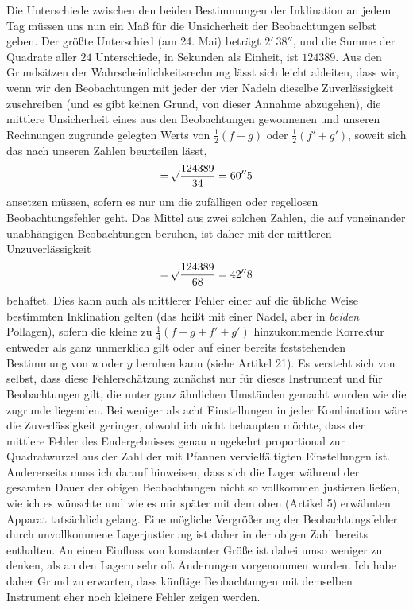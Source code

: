 Die Unterschiede zwischen den beiden Bestimmungen der Inklination an jedem Tag müssen uns nun ein Maß für die Unsicherheit der Beobachtungen selbst geben. Der größte Unterschied (am 24. Mai) beträgt $2'\ 38''$, und die Summe der Quadrate aller $24$ Unterschiede, in Sekunden als Einheit, ist $124389$. Aus den Grundsätzen der Wahrscheinlichkeitsrechnung lässt sich leicht ableiten, dass wir, wenn wir den Beobachtungen mit jeder der vier Nadeln dieselbe Zuverlässigkeit zuschreiben (und es gibt keinen Grund, von dieser Annahme abzugehen), die mittlere Unsicherheit eines aus den Beobachtungen gewonnenen und unseren Rechnungen zugrunde gelegten Werts von $\tfrac12(f+g)$ oder $\tfrac12(f'+g')$, soweit sich das nach unseren Zahlen beurteilen lässt,
\[
=\mathord{{}^{}\!\surd}\frac{124389}{34}=60''5
\]
ansetzen müssen, sofern es nur um die zufälligen oder regellosen Beobachtungsfehler geht. Das Mittel aus zwei solchen Zahlen, die auf voneinander unabhängigen Beobachtungen beruhen, ist daher mit der mittleren Unzuverlässigkeit
\[
=\mathord{{}^{}\!\surd}\frac{124389}{68}=42''8
\]
behaftet. Dies kann auch als mittlerer Fehler einer auf die übliche Weise bestimmten Inklination gelten (das heißt mit einer Nadel, aber in \textit{beiden} Pollagen), sofern die kleine zu $\tfrac14(f+g+f'+g')$ hinzukommende Korrektur entweder als ganz unmerklich gilt oder auf einer bereits feststehenden Bestimmung von $u$ oder $y$ beruhen kann (siehe Artikel 21). Es versteht sich von selbst, dass diese Fehlerschätzung zunächst nur für dieses Instrument und für Beobachtungen gilt, die unter ganz ähnlichen Umständen gemacht wurden wie die zugrunde liegenden. Bei weniger als acht Einstellungen in jeder Kombination wäre die Zuverlässigkeit geringer, obwohl ich nicht behaupten möchte, dass der mittlere Fehler des Endergebnisses genau umgekehrt proportional zur Quadratwurzel aus der Zahl der mit Pfannen vervielfältigten Einstellungen ist. Andererseits muss ich darauf hinweisen, dass sich die Lager während der gesamten Dauer der obigen Beobachtungen nicht so vollkommen justieren ließen, wie ich es wünschte und wie es mir später mit dem oben (Artikel 5) erwähnten Apparat tatsächlich gelang. Eine mögliche Vergrößerung der Beobachtungsfehler durch unvollkommene Lagerjustierung ist daher in der obigen Zahl bereits enthalten. An einen Einfluss von konstanter Größe ist dabei umso weniger zu denken, als an den Lagern sehr oft Änderungen vorgenommen wurden. Ich habe daher Grund zu erwarten, dass künftige Beobachtungen mit demselben Instrument eher noch kleinere Fehler zeigen werden.


